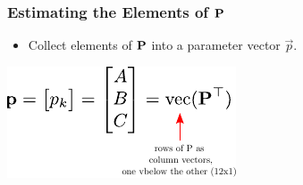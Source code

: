 \begin{frame}
  \frametitle{Estimating the Elements of $\boldsymbol{\mathbf{P}}$}
  \begin{itemize}
    \item Collect elements of $\boldsymbol{\mathbf{P}}$ into a parameter vector $\vec{p}$.
  \end{itemize}

  \begin{center}
    \includegraphics[width=0.5\columnwidth]{./images/projection_matrix_column_vector.pdf}
  \end{center}
  
\end{frame}

